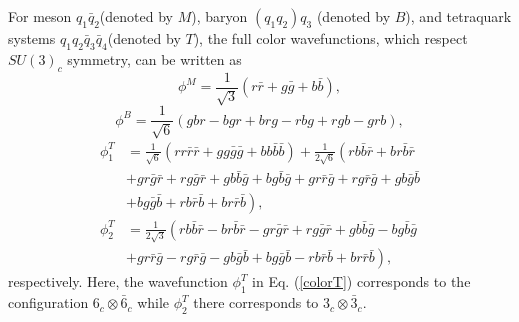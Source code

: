 \documentclass[prd,twocolumn,floatfix,nofootinbib]{revtex4}
\begin{document}
\label{AppendixA} \setcounter{equation}{0} \renewcommand{\theequation}{A%
\arabic{equation}} For meson $q_{1}\bar{q}_{2}$(denoted by $M$), baryon $%
(q_{1}q_{2})q_{3}$ (denoted by $B$), and tetraquark systems $q_{1}q_{2}\bar{q%
}_{3}\bar{q}_{4}$(denoted by $T$), the full color wavefunctions, which
respect $SU(3)_{c}$ symmetry, can be written as
\begin{equation}
\phi ^{M}=\frac{1}{\sqrt{3}}\left( r\bar{r}+g\bar{g}+b\bar{b}\right) ,
\label{pcolorM}
\end{equation}%
\begin{equation}
\phi ^{B}=\frac{1}{\sqrt{6}}\left( gbr-bgr+brg-rbg+rgb-grb\right) ,
\label{pcolorB}
\end{equation}%
\begin{equation}
\begin{aligned} \phi_{1}^{T}&=\frac{1}{\sqrt{6}}
\left(rr\bar{r}\bar{r}+gg\bar{g}\bar{g}+bb\bar{b}\bar{b} \right)
+\frac{1}{2\sqrt{6}} \left(rb\bar{b}\bar{r}+br\bar{b}\bar{r} \right.\\
&\left.
+gr\bar{g}\bar{r}+rg\bar{g}\bar{r}+gb\bar{b}\bar{g}+bg\bar{b}\bar{g}+gr%
\bar{r}\bar{g}+rg\bar{r}\bar{g}+gb\bar{g}\bar{b} \right.\\ &\left.
+bg\bar{g}\bar{b}+rb\bar{r}\bar{b}+br\bar{r}\bar{b} \right), \\
\phi_{2}^{T}&=\frac{1}{2\sqrt{3}}
\left(rb\bar{b}\bar{r}-br\bar{b}\bar{r}-gr\bar{g}\bar{r}+rg\bar{g}\bar{r}+gb%
\bar{b}\bar{g}-bg\bar{b}\bar{g} \right.\\ &\left.
+gr\bar{r}\bar{g}-rg\bar{r}\bar{g}-gb\bar{g}\bar{b}+bg\bar{g}\bar{b}-rb%
\bar{r}\bar{b}+br\bar{r}\bar{b}\right), \end{aligned}  \label{pcolorT}
\end{equation}%
respectively. Here, the wavefunction $\phi _{1}^{T}$ in Eq. (\ref{colorT})
corresponds to the configuration $6_{c}\otimes \bar{6}_{c}$ while $\phi
_{2}^{T}$ there corresponds to $3_{c}\otimes \bar{3}_{c}$.
\end{document}
